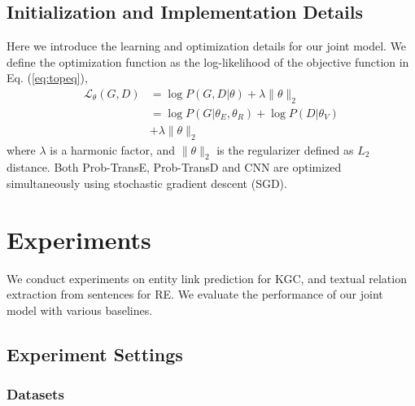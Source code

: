 \documentclass[letterpaper]{article} %
\begin{document}


\subsection{Initialization and Implementation Details}
\label{sec:detail}
Here we introduce the learning and optimization details for our joint model. We define the optimization function as the log-likelihood of the objective function in Eq. (\ref{eq:topeq}),
\begin{align}
\mathcal{L}_{\theta}(G, D) & = \log P(G,D|{\theta}) + \lambda \lVert \theta \rVert_2 \\\nonumber
 & = \log P(G|{\theta_E, \theta_R}) + \log P(D|{\theta_V}) \\\nonumber
 & + \lambda \lVert \theta \rVert_2
\end{align}
where $\lambda$ is a harmonic factor, and $\lVert \theta \rVert_2$ is the regularizer defined as $L_2$ distance. Both Prob-TransE, Prob-TransD and CNN are optimized simultaneously using stochastic gradient descent (SGD). 



\section{Experiments}
\label{sec:experiments}

We conduct experiments on entity link prediction for KGC, and textual relation extraction from sentences for RE. We evaluate the performance of our joint model with various baselines. 


\subsection{Experiment Settings}



\subsubsection{Datasets}
\end{document}
